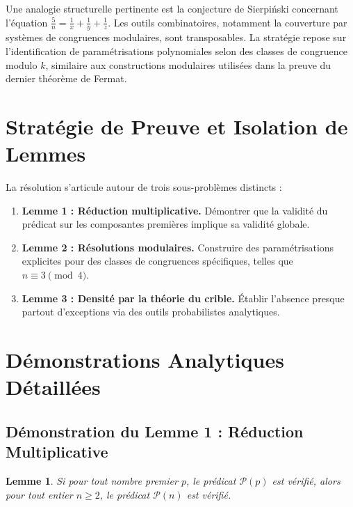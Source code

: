 \documentclass[12pt,a4paper]{article}
\newtheorem{lemma}{Lemme}
\begin{document}
Une analogie structurelle pertinente est la conjecture de Sierpi\'{n}ski concernant l'équation $\frac{5}{n} = \frac{1}{x} + \frac{1}{y} + \frac{1}{z}$. Les outils combinatoires, notamment la couverture par systèmes de congruences modulaires, sont transposables. La stratégie repose sur l'identification de paramétrisations polynomiales selon des classes de congruence modulo $k$, similaire aux constructions modulaires utilisées dans la preuve du dernier théorème de Fermat.

\section{Stratégie de Preuve et Isolation de Lemmes}

La résolution s'articule autour de trois sous-problèmes distincts :
\begin{enumerate}
    \item \textbf{Lemme 1 : Réduction multiplicative.} Démontrer que la validité du prédicat sur les composantes premières implique sa validité globale.
    \item \textbf{Lemme 2 : Résolutions modulaires.} Construire des paramétrisations explicites pour des classes de congruences spécifiques, telles que $n \equiv 3 \pmod 4$.
    \item \textbf{Lemme 3 : Densité par la théorie du crible.} Établir l'absence presque partout d'exceptions via des outils probabilistes analytiques.
\end{enumerate}

\section{Démonstrations Analytiques Détaillées}

\subsection{Démonstration du Lemme 1 : Réduction Multiplicative}

\begin{lemma}
Si pour tout nombre premier $p$, le prédicat $\mathcal{P}(p)$ est vérifié, alors pour tout entier $n \geq 2$, le prédicat $\mathcal{P}(n)$ est vérifié.
\end{lemma}
\end{document}
